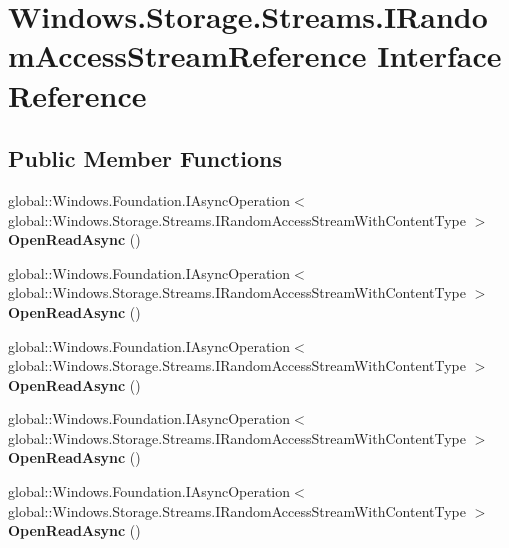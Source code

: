 \hypertarget{interface_windows_1_1_storage_1_1_streams_1_1_i_random_access_stream_reference}{}\section{Windows.\+Storage.\+Streams.\+I\+Random\+Access\+Stream\+Reference Interface Reference}
\label{interface_windows_1_1_storage_1_1_streams_1_1_i_random_access_stream_reference}
\subsection*{Public Member Functions}
\begin{DoxyCompactItemize}
\item 
\mbox{\label{interface_windows_1_1_storage_1_1_streams_1_1_i_random_access_stream_reference_ae88f96f24201e3ef53f3eae631c3cb37}} 
global\+::\+Windows.\+Foundation.\+I\+Async\+Operation$<$ global\+::\+Windows.\+Storage.\+Streams.\+I\+Random\+Access\+Stream\+With\+Content\+Type $>$ {\bfseries Open\+Read\+Async} ()
\item 
\mbox{\label{interface_windows_1_1_storage_1_1_streams_1_1_i_random_access_stream_reference_ae88f96f24201e3ef53f3eae631c3cb37}} 
global\+::\+Windows.\+Foundation.\+I\+Async\+Operation$<$ global\+::\+Windows.\+Storage.\+Streams.\+I\+Random\+Access\+Stream\+With\+Content\+Type $>$ {\bfseries Open\+Read\+Async} ()
\item 
\mbox{\label{interface_windows_1_1_storage_1_1_streams_1_1_i_random_access_stream_reference_ae88f96f24201e3ef53f3eae631c3cb37}} 
global\+::\+Windows.\+Foundation.\+I\+Async\+Operation$<$ global\+::\+Windows.\+Storage.\+Streams.\+I\+Random\+Access\+Stream\+With\+Content\+Type $>$ {\bfseries Open\+Read\+Async} ()
\item 
\mbox{\label{interface_windows_1_1_storage_1_1_streams_1_1_i_random_access_stream_reference_ae88f96f24201e3ef53f3eae631c3cb37}} 
global\+::\+Windows.\+Foundation.\+I\+Async\+Operation$<$ global\+::\+Windows.\+Storage.\+Streams.\+I\+Random\+Access\+Stream\+With\+Content\+Type $>$ {\bfseries Open\+Read\+Async} ()
\item 
\mbox{\label{interface_windows_1_1_storage_1_1_streams_1_1_i_random_access_stream_reference_ae88f96f24201e3ef53f3eae631c3cb37}} 
global\+::\+Windows.\+Foundation.\+I\+Async\+Operation$<$ global\+::\+Windows.\+Storage.\+Streams.\+I\+Random\+Access\+Stream\+With\+Content\+Type $>$ {\bfseries Open\+Read\+Async} ()
\end{DoxyCompactItemize}



